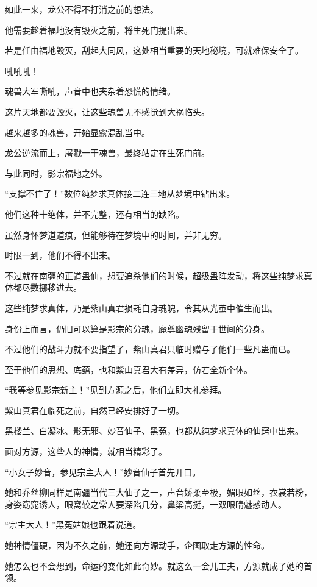 \begin{this_body}
如此一来，龙公不得不打消之前的想法。

他需要趁着福地没有毁灭之前，将生死门提出来。

若是任由福地毁灭，刮起大同风，这处相当重要的天地秘境，可就难保安全了。

吼吼吼！

魂兽大军嘶吼，声音中也夹杂着恐慌的情绪。

这片天地都要毁灭，让这些魂兽无不感觉到大祸临头。

越来越多的魂兽，开始显露混乱当中。

龙公逆流而上，屠戮一干魂兽，最终站定在生死门前。

与此同时，影宗福地之外。

“支撑不住了！”数位纯梦求真体接二连三地从梦境中钻出来。

他们这种十绝体，并不完整，还有相当的缺陷。

虽然身怀梦道道痕，但能够待在梦境中的时间，并非无穷。

时限一到，他们不得不出来。

不过就在南疆的正道蛊仙，想要追杀他们的时候，超级蛊阵发动，将这些纯梦求真体都尽数挪移进去。

这些纯梦求真体，乃是紫山真君损耗自身魂魄，令其从光茧中催生而出。

身份上而言，仍旧可以算是影宗的分魂，魔尊幽魂残留于世间的分身。

不过他们的战斗力就不要指望了，紫山真君只临时赠与了他们一些凡蛊而已。

至于他们的思想、底蕴，也和紫山真君大有差异，仿若全新个体。

“我等参见影宗新主！”见到方源之后，他们立即大礼参拜。

紫山真君在临死之前，自然已经安排好了一切。

黑楼兰、白凝冰、影无邪、妙音仙子、黑菟，也都从纯梦求真体的仙窍中出来。

面对方源，这些人的神情，就相当精彩了。

“小女子妙音，参见宗主大人！”妙音仙子首先开口。

她和乔丝柳同样是南疆当代三大仙子之一，声音娇柔至极，媚眼如丝，衣裳若粉，身姿窈窕诱人，眼窝较之常人要深陷几分，鼻梁高挺，一双眼睛魅惑动人。

“宗主大人！”黑菟姑娘也跟着说道。

她神情僵硬，因为不久之前，她还向方源动手，企图取走方源的性命。

她怎么也不会想到，命运的变化如此奇妙。就这么一会儿工夫，方源就成了她的首领。


\end{this_body}
